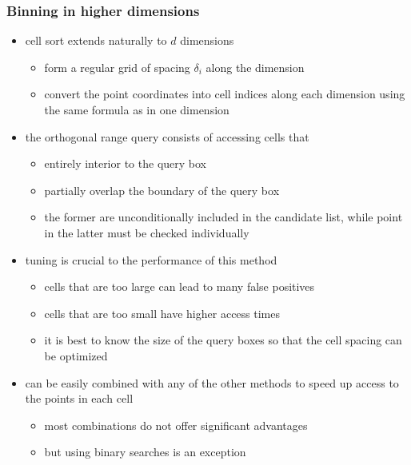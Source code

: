 \begin{frame}[fragile]
%
  \frametitle{Binning in higher dimensions}
%
  \begin{itemize}
%
  \item cell sort extends naturally to $d$ dimensions
    \begin{itemize}
    \item form a regular grid of spacing $\delta_{i}$ along the  dimension
    \item convert the point coordinates into cell indices along each dimension using the same
      formula as in one dimension
    \end{itemize}
%
    \item the orthogonal range query consists of accessing cells that
      \begin{itemize}
      \item entirely interior to the query box
      \item partially overlap the boundary of the query box
      \item the former are unconditionally included in the candidate list, while point in the
        latter must be checked individually
      \end{itemize}
%
    \item tuning is crucial to the performance of this method
      \begin{itemize}
      \item cells that are too large can lead to many false positives
      \item cells that are too small have higher access times
      \item it is best to know the size of the query boxes so that the cell spacing can be
        optimized
      \end{itemize}
%
    \item can be easily combined with any of the other methods to speed up access to the points
      in each cell
      \begin{itemize}
      \item most combinations do not offer significant advantages
      \item but using binary searches is an exception
      \end{itemize}
%
  \end{itemize}
%
\end{frame}

